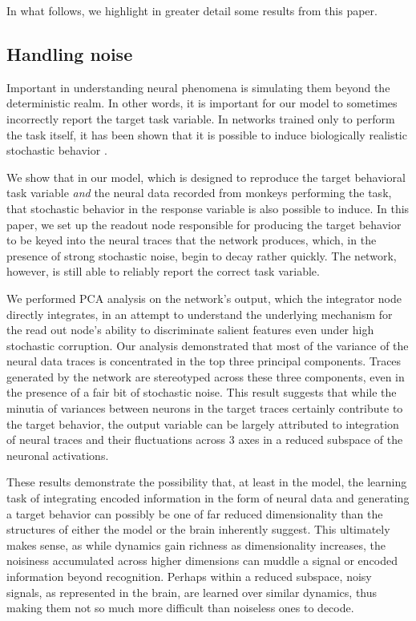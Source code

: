 \documentclass[12pt,a4paper,final]{iopart}
\begin{document}
In what follows, we highlight in greater detail some results from this paper.

\subsection{Handling noise}
Important in understanding neural phenomena is simulating them beyond the deterministic realm. In other words, it is important for our model to sometimes incorrectly report the target task variable. In networks trained only to perform the task itself, it has been shown that it is possible to induce biologically realistic stochastic behavior \cite{CohenLol, Mante2013}. 

We show that in our model, which is designed to reproduce the target behavioral task variable \emph{and} the neural data recorded from monkeys performing the task, that stochastic behavior in the response variable is also possible to induce. In this paper, we set up the readout node responsible for producing the target behavior to be keyed into the neural traces that the network produces, which, in the presence of strong stochastic noise, begin to decay rather quickly. The network, however, is still able to reliably report the correct task variable. 

We performed PCA analysis on the network's output, which the integrator node directly integrates, in an attempt to understand the underlying mechanism for the read out node's ability to discriminate salient features even under high stochastic corruption. Our analysis demonstrated that most of the variance of the neural data traces is concentrated in the top three principal components. Traces generated by the network are stereotyped across these three components, even in the presence of a fair bit of stochastic noise. This result suggests that while the minutia of variances between neurons in the target traces certainly contribute to the target behavior, the output variable can be largely attributed to integration of neural traces and their fluctuations across $3$ axes in a reduced subspace of the neuronal activations.

These results demonstrate the possibility that, at least in the model, the learning task of integrating encoded information in the form of neural data and generating a target behavior can possibly be one of far reduced dimensionality than the structures of either the model or the brain inherently suggest. This ultimately makes sense, as while dynamics gain richness as dimensionality increases, the noisiness accumulated across higher dimensions can muddle a signal or encoded information beyond recognition. Perhaps within a reduced subspace, noisy signals, as represented in the brain, are learned over similar dynamics, thus making them not so much more difficult than noiseless ones to decode.
\end{document}
